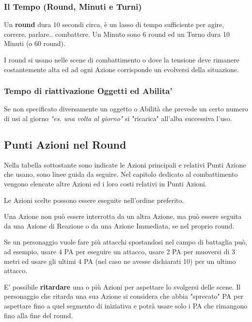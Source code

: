 \documentclass[12pt,a4paper,twoside,openany]{book}
\begin{document}
\begin{multicols}{2}
\subsubsection{Il Tempo (Round, Minuti e Turni)}\label{iltempo}

Un \textbf{round} dura 10 secondi circa, è un lasso di tempo sufficiente per agire, correre, parlare.. combattere. Un Minuto sono 6 round ed un Turno dura 10 Minuti (o 60 round).

I round si usano nelle scene di combattimento o dove la tensione deve rimanere costantemente alta ed ad ogni Azione corrisponde un evolversi della situazione.

\subsubsection{Tempo di riattivazione Oggetti ed Abilita'}\label{temporiattivazioneoggetti}

Se non specificato diversamente un oggetto o Abilità che prevede un certo numero di usi al giorno \textit{"es. una volta al giorno"} si "ricarica" all'alba successiva l'uso.

\subsection{Punti Azioni nel Round}\label{azioninelround}

Nella tabella sottostante sono indicate le Azioni principali e relativi Punti Azione che usano, sono linee guida da seguire. Nel capitolo dedicato al combattimento vengono elencate altre Azioni ed i loro costi relativi in Punti Azioni.

Le Azioni scelte possono essere eseguite nell'ordine preferito.

Una Azione non può essere interrotta da un altra Azione, ma può essere seguita da una Azione di Reazione o da una Azione Immediata, se nel proprio round.

Se un personaggio vuole fare più attacchi spostandosi nel campo di battaglia può, ad esempio, usare 4 PA per eseguire un attacco, usare 2 PA per muoversi di 3 metri ed usare gli ultimi 4 PA (nel caso ne avesse dichiarati 10) per un ultimo attacco.

E' possibile \textbf{ritardare} una o più Azioni per aspettare lo svolgersi delle scene. Il personaggio che ritarda una sua Azione si considera che abbia "sprecato" PA per aspettare fino a quel segmento di iniziativa e potrà usare solo i PA che rimangono fino alla fine del round.


\end{multicols}
\end{document}
